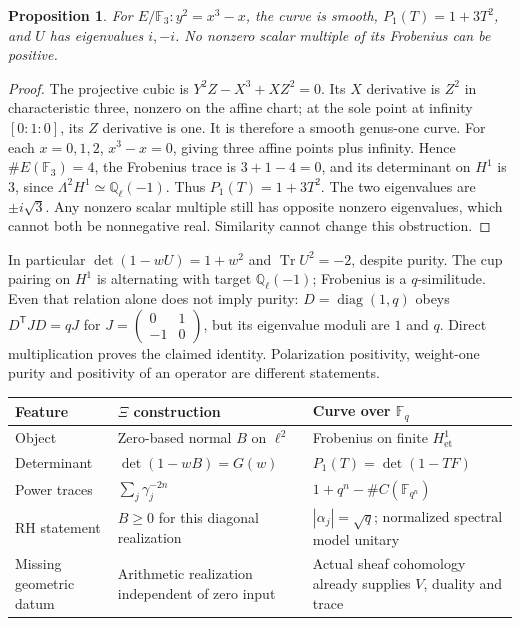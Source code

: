 \documentclass[11pt,a4paper]{article}
\newcommand{\Tr}{\operatorname{Tr}}
\newcommand{\diag}{\operatorname{diag}}
\newcommand{\Q}{\mathbb Q}
\newcommand{\F}{\mathbb F}
\newtheorem*{proposition}{Proposition}
\begin{document}
\begin{proposition}
For $E/\F_3:y^2=x^3-x$, the curve is smooth, $P_1(T)=1+3T^2$, and $U$ has eigenvalues $i,-i$. No nonzero scalar multiple of its Frobenius can be positive.
\end{proposition}
\begin{proof}
The projective cubic is $Y^2Z-X^3+XZ^2=0$. Its $X$ derivative is $Z^2$ in characteristic three, nonzero on the affine chart; at the sole point at infinity $[0:1:0]$, its $Z$ derivative is one. It is therefore a smooth genus-one curve. For each $x=0,1,2$, $x^3-x=0$, giving three affine points plus infinity. Hence $\#E(\F_3)=4$, the Frobenius trace is $3+1-4=0$, and its determinant on $H^1$ is $3$, since $\Lambda^2H^1\simeq\Q_\ell(-1)$. Thus $P_1(T)=1+3T^2$. The two eigenvalues are $\pm i\sqrt3$. Any nonzero scalar multiple still has opposite nonzero eigenvalues, which cannot both be nonnegative real. Similarity cannot change this obstruction.
\end{proof}
In particular $\det(1-wU)=1+w^2$ and $\Tr U^2=-2$, despite purity. The cup pairing on $H^1$ is alternating with target $\Q_\ell(-1)$; Frobenius is a $q$-similitude. Even that relation alone does not imply purity: $D=\diag(1,q)$ obeys $D^{\mathsf T}JD=qJ$ for $J=\left(\begin{smallmatrix}0&1\\-1&0\end{smallmatrix}\right)$, but its eigenvalue moduli are $1$ and $q$. Direct multiplication proves the claimed identity. Polarization positivity, weight-one purity and positivity of an operator are different statements.

\begin{center}\small
\begin{tabular}{p{}p{}p{}}
\toprule
Feature & $\Xi$ construction & Curve over $\F_q$\\\midrule
Object & Zero-based normal $B$ on $\ell^2$ & Frobenius on finite $H^1_{\mathrm{et}}$\\
Determinant & $\det(1-wB)=G(w)$ & $P_1(T)=\det(1-TF)$\\
Power traces & $\sum_j\gamma_j^{-2n}$ & $1+q^n-\#C(\F_{q^n})$\\
RH statement & $B\ge0$ for this diagonal realization & $|\alpha_j|=\sqrt q$; normalized spectral model unitary\\
Missing geometric datum & Arithmetic realization independent of zero input & Actual sheaf cohomology already supplies $V$, duality and trace\\\bottomrule
\end{tabular}\end{center}
\end{document}
